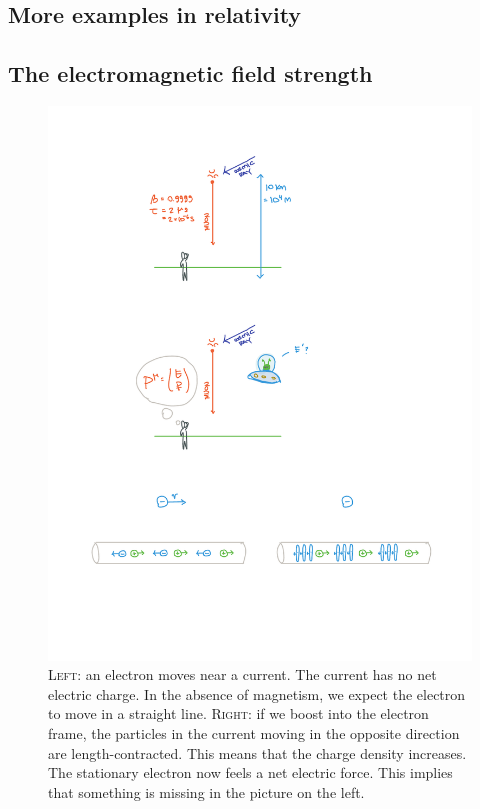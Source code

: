 \documentclass[12pt, oneside]{report}    %
\let\oldsection\section
\def\section{%
  \setcounter{sidenote}{1}%
  \oldsection
}
\begin{document}
\begin{subappendices}
\section{More examples in relativity}

\subsection{%
The electromagnetic field strength}

\begin{figure}[tb]
    \centering
    \includegraphics[width=\textwidth]{figures/EMcurrent.pdf}
    \caption{\textsc{Left}: an electron moves near a current. The current has no net electric charge. In the absence of magnetism, we expect the electron to move in a straight line. \textsc{Right}: if we boost into the electron frame, the particles in the current moving in the opposite direction are length-contracted. This means that the charge density increases. The stationary electron now feels a net electric force. This implies that something is missing in the picture on the left.}
    \label{fig:current}
\end{figure}


\end{subappendices}
\end{document}
